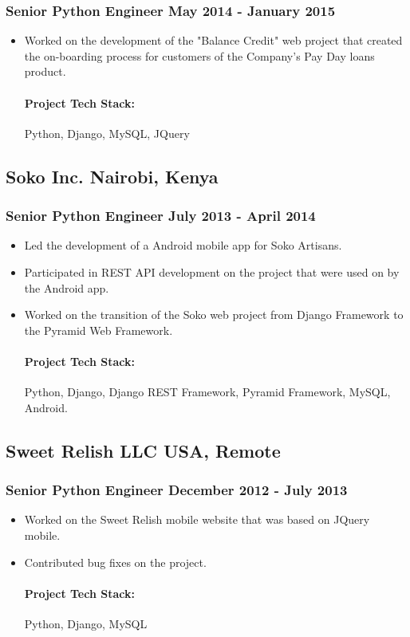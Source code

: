\documentclass[11pt]{article} %
\begin{document}
\subsubsection{Senior Python Engineer \hfill  May 2014 - January 2015}
\begin{itemize}
    \item Worked on the development of the "Balance Credit" web project that created the on-boarding process for customers of the Company's Pay Day loans product.
    \paragraph{Project Tech Stack:} Python, Django, MySQL, JQuery
\end{itemize}

\subsection{Soko Inc. \hfill Nairobi, Kenya}
\subsubsection{Senior Python Engineer \hfill  July 2013 - April 2014}
\begin{itemize}
    \item Led the development of a Android mobile app for Soko Artisans.
    \item Participated in REST API development on the project that were used on by the Android app.
    \item Worked on the transition of the Soko web project from Django Framework to the Pyramid Web Framework.
    \paragraph{Project Tech Stack:} Python, Django, Django REST Framework, Pyramid Framework, MySQL, Android.
\end{itemize}

\subsection{Sweet Relish LLC \hfill USA, Remote}
\subsubsection{Senior Python Engineer \hfill  December 2012 - July 2013}
\begin{itemize}
    \item Worked on the Sweet Relish mobile website that was based on JQuery mobile.
    \item Contributed bug fixes on the project.
    \paragraph{Project Tech Stack:} Python, Django, MySQL
\end{itemize}
\end{document}
